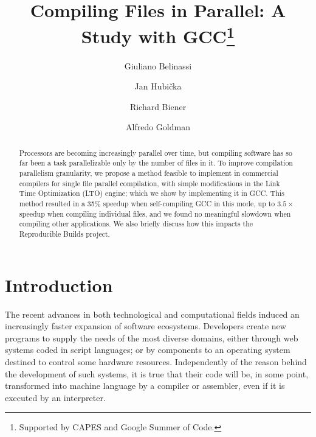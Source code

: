 \documentclass[runningheads]{llncs}
\begin{document}


%
\title{Compiling Files in Parallel: A Study with GCC\thanks{Supported by CAPES and Google Summer of Code.}}
%
%
\author{Giuliano Belinassi \and Jan Hubi\v cka  \and Richard Biener \and Alfredo Goldman}
%
%

%
\maketitle              %
%
\begin{abstract}

Processors are becoming increasingly parallel over time, but compiling
software has so far been a task parallelizable only by the number of
files in it. To improve compilation parallelism granularity, we propose
a method feasible to implement in commercial compilers for single file
parallel compilation, with simple modifications in the Link Time
Optimization (LTO) engine; which we show by implementing
it in GCC. This method resulted in a 35\% speedup when self-compiling
GCC in this mode, up to $3.5\times$ speedup when compiling individual files,
and we found no meaningful slowdown when compiling other applications.
We also briefly discuss how this impacts the Reproducible Builds project.

\end{abstract}
%
%
%
\section{Introduction}

The recent advances in both technological and computational fields induced an
increasingly faster expansion of software ecosystems. Developers create new
programs to supply the needs of the most diverse domains, either through web
systems coded in script languages; or by components to an operating system
destined to control some hardware resources. Independently of the reason behind
the development of such systems, it is true that their code will be, in some
point, transformed into machine language by a compiler or assembler, even if it
is executed by an interpreter.
\end{document}
